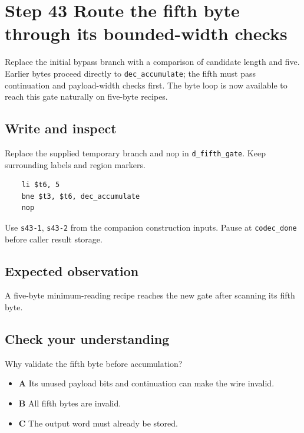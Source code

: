 \section{Step 43 Route the fifth byte through its bounded-width checks}\label{delta-s43}

Replace the initial bypass branch with a comparison of candidate length and five. Earlier bytes proceed directly to \texttt{dec\_accumulate}; the fifth must pass continuation and payload-width checks first. The byte loop is now available to reach this gate naturally on five-byte recipes.

\subsection{Write and inspect}
Replace the supplied temporary branch and nop in \texttt{d\_fifth\_gate}. Keep surrounding labels and region markers.

\begin{verbatim}
    li $t6, 5
    bne $t3, $t6, dec_accumulate
    nop
\end{verbatim}
Use \texttt{s43-1}, \texttt{s43-2} from the companion construction inputs. Pause at \texttt{codec\_done} before caller result storage.

\subsection{Expected observation}
A five-byte minimum-reading recipe reaches the new gate after scanning its fifth byte.

\subsection{Check your understanding}
Why validate the fifth byte before accumulation?

\begin{itemize}
  \item \textbf{A} Its unused payload bits and continuation can make the wire invalid.
  \item \textbf{B} All fifth bytes are invalid.
  \item \textbf{C} The output word must already be stored.
\end{itemize}
